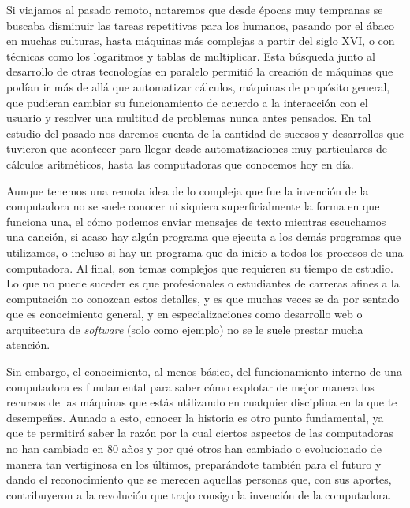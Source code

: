 \documentclass[letterpaper,12pt,oneside]{book}
\begin{document}
	Si viajamos al pasado remoto, notaremos que desde épocas muy tempranas se buscaba disminuir las tareas repetitivas para los humanos, pasando por el ábaco
	en muchas culturas, hasta máquinas más complejas a partir del siglo XVI, o con técnicas como los logaritmos y tablas de multiplicar. Esta búsqueda junto
	al desarrollo de otras tecnologías en paralelo permitió la creación de máquinas que podían ir más de allá que automatizar cálculos,
	máquinas de propósito general, que pudieran cambiar su funcionamiento de acuerdo a la interacción con el usuario y resolver
	una multitud de problemas nunca antes pensados\cite{ifrah_universal_2001}. En tal estudio del pasado nos daremos cuenta de la cantidad de sucesos y desarrollos que tuvieron 
	que acontecer para llegar desde automatizaciones muy particulares de cálculos aritméticos, hasta las computadoras que conocemos hoy en día. 

	Aunque tenemos una remota idea de lo compleja que fue la invención de la computadora no se suele conocer ni siquiera superficialmente
	la forma en que funciona una, el cómo podemos enviar mensajes de texto mientras escuchamos una canción, si acaso hay algún programa que ejecuta a los 
	demás programas que utilizamos, o incluso si hay un programa que da inicio a todos los procesos de una computadora. Al final, son temas complejos
	que requieren su tiempo de estudio. Lo que no puede suceder es que profesionales o estudiantes de carreras afines a la computación no conozcan estos detalles, y
	es que muchas veces se da por sentado que es conocimiento general, y en especializaciones como desarrollo web o arquitectura de \textit{software} (solo como ejemplo) no se le suele
	prestar mucha atención.
 
    Sin embargo, el conocimiento, al menos básico, del funcionamiento interno de una computadora es fundamental para saber
	cómo explotar de mejor manera los recursos de las máquinas que estás utilizando en cualquier disciplina en la que te desempeñes. Aunado a esto, conocer la historia
	es otro punto fundamental,
	ya que te permitirá saber la razón por la cual ciertos aspectos de las computadoras no han cambiado en 80 años y por qué otros han cambiado o evolucionado
	de manera tan vertiginosa en los últimos, preparándote también para el futuro y dando el reconocimiento que se merecen aquellas personas que,
	con sus aportes, contribuyeron a la revolución que trajo consigo la invención de la computadora.
	
\end{document}
